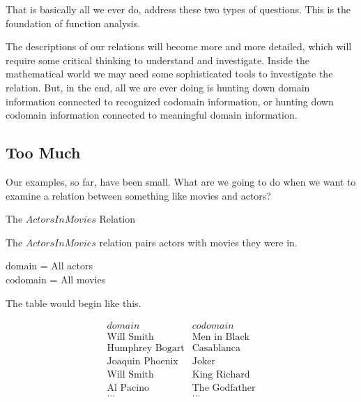 \documentclass{ximera}
\begin{document}
That is basically all we ever do, address these two types of questions. This is the foundation of function analysis.

The descriptions of our relations will become more and more detailed, which will require some critical thinking to understand and investigate. Inside the mathematical world we may need some sophisticated tools to investigate the relation.  But, in the end, all we are ever doing is hunting down domain information connected to recognized codomain information, or hunting down codomain information connected to meaningful domain information. 









\hfill\break


\subsection*{Too Much}

\hfill\break

Our examples, so far, have been small.  What are we going to do when we want to examine a relation between something like movies and actors?  


\begin{example} The $ActorsInMovies$ Relation

The $ActorsInMovies$ relation pairs actors with movies they were in.

domain = All actors \\
codomain = All movies

The table would begin like this.

\[
\begin{array}{l|l}
    domain      & codomain      \\ \hline
    \text{Will Smith}   &  \text{Men in Black} \\
    \text{Humphrey Bogart}   & \text{Casablanca} \\
    \text{Joaquin Phoenix}  &  \text{Joker} \\
    \text{Will Smith}  &  \text{King Richard} \\
    \text{Al Pacino} &  \text{The Godfather} \\ 
    \text{...} &  \text{...} \\ 
\end{array}
\]

\end{example} 
\end{document}
